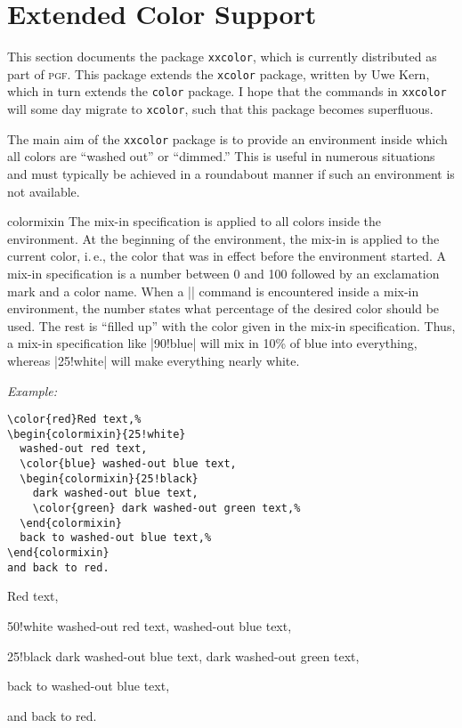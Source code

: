 \documentclass{ltxdoc}
\def\pgf{\textsc{pgf}}
\def\example{\par\smallskip\noindent\textit{Example: }}
\begin{document}
\section{Extended Color Support}

This section documents the package \texttt{xxcolor}, which is
currently distributed as part of \pgf. This package extends the
\texttt{xcolor} package, written by Uwe Kern, which in turn extends
the \texttt{color} package. I hope that the commands in
\texttt{xxcolor} will some day migrate to \texttt{xcolor}, such that
this package becomes superfluous.

The main aim of the \texttt{xxcolor} package is to provide an
environment inside which all colors are ``washed out'' or ``dimmed.''
This is useful in numerous situations and must typically be achieved
in a roundabout manner if such an environment is not available.

\begin{environment}{{colormixin}}
  The mix-in specification is applied to all colors inside
  the environment. At the beginning of the environment, the mix-in is
  applied to the current color, i.\,e., the color that was in effect
  before the environment started. A mix-in specification is a number
  between 0 and 100 followed by an exclamation mark and a color
  name. When a |\color| command is 
  encountered inside a mix-in environment, the number states what
  percentage of the desired color should be used. The rest is
  ``filled up'' with the color given in the mix-in
  specification. Thus, a mix-in specification like |90!blue|
  will mix in 10\% of blue into everything, whereas |25!white| will
  make everything nearly white.
  \example
\begin{verbatim}
\color{red}Red text,%
\begin{colormixin}{25!white}
  washed-out red text,
  \color{blue} washed-out blue text,
  \begin{colormixin}{25!black}
    dark washed-out blue text,
    \color{green} dark washed-out green text,%
  \end{colormixin}
  back to washed-out blue text,%
\end{colormixin}
and back to red.
\end{verbatim}

{
\noindent\color{red}Red text,
\begin{colormixin}{50!white}
  washed-out red text,
  \color{blue} washed-out blue text,
  \begin{colormixin}{25!black}
    dark washed-out blue text,
    \color{green} dark washed-out green text,%
  \end{colormixin}
  back to washed-out blue text,%
\end{colormixin}
and back to red.}
\end{environment}
\end{document}
